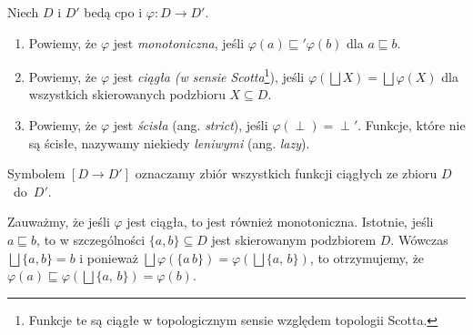 \begin{definicja}\label{def:m_cont}%
Niech \(D\) i \(D'\) bedą cpo i \(\varphi: D\to D'\).
\begin{enumerate}[label={(\alph*)}, ref={(\alph*)}] 
  \setlength\itemsep{0em}
\item Powiemy, że \(\varphi\) jest \emph{monotoniczna}, jeśli \(\varphi(a) \sqsubseteq' \varphi(b)\) dla \(a\sqsubseteq b\).
\item Powiemy, że \(\varphi\) jest \emph{ciągła (w sensie Scotta}\footnote{Funkcje te są ciągłe w topologicznym sensie względem topologii Scotta.}), jeśli \(\varphi(\bigsqcup X) = \bigsqcup \varphi (X)\) dla wszystkich skierowanych podzbioru \(X\subseteq D\).\label{def:m_cont_2}
\item Powiemy, że \(\varphi\) jest \emph{ścisła} (ang. \emph{strict}), jeśli \(\varphi(\perp)=\perp'\). Funkcje, które nie są ścisłe, nazywamy niekiedy \emph{leniwymi} (ang. \emph{lazy}).
\end{enumerate}
Symbolem \([D\to D']\) oznaczamy zbiór wszystkich funkcji ciągłych ze zbioru \(D\)~do~\(D'\).
\end{definicja}

\begin{uwaga*}
Zauważmy, że jeśli \(\varphi\) jest ciągła, to jest również monotoniczna. Istotnie, jeśli \(a\sqsubseteq b\), to w szczególności \(\{a, b\}\subseteq D\) jest skierowanym podzbiorem \(D\). Wówczas \(\bigsqcup\{a, b\}=b\) i ponieważ \(\bigsqcup \varphi(\{a\,b\})=\varphi(\bigsqcup\{a,\,b\})\), to otrzymujemy, że \(\varphi(a)\sqsubseteq \varphi(\bigsqcup\{a,\,b\}) = \varphi(b)\).
\end{uwaga*}

